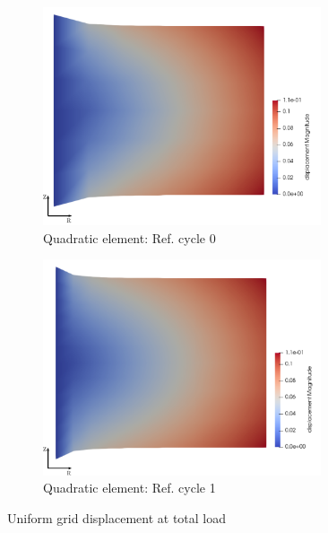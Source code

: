 \documentclass[11pt,a4paper,final]{article}
\begin{document}
\begin{figure}[h!]
\begin{subfigure}[b]{0.35\textwidth}
\includegraphics[width=0.9\textwidth]{patch_uniform_grid_ref_0_quad.pdf}
\caption{Quadratic element: Ref. cycle 0}
\label{fig:1.3.3}
\end{subfigure}
\begin{subfigure}[b]{0.35\textwidth}
\centering
\includegraphics[width=0.9\textwidth]{patch_uniform_grid_ref_1_quad.pdf}
\caption{Quadratic element: Ref. cycle 1}
\label{fig:1.3.4}
\end{subfigure}
\caption{Uniform grid displacement at total load}
\label{fig:1.3}
\end{figure}
\end{document}
